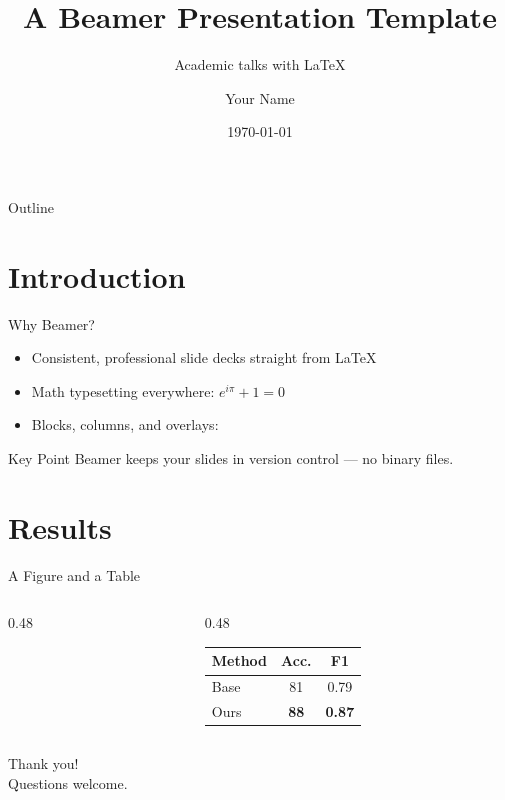 \documentclass[aspectratio=169, 11pt]{beamer}
\title[Short Title]{A Beamer Presentation Template}
\subtitle{Academic talks with \LaTeX}
\author{Your Name}
\institute{Example University}
\date{\today}
\begin{document}
\begin{frame}
  \titlepage
\end{frame}

\begin{frame}{Outline}
  \tableofcontents
\end{frame}

\section{Introduction}

\begin{frame}{Why Beamer?}
  \begin{itemize}
    \item Consistent, professional slide decks straight from \LaTeX{}
    \item Math typesetting everywhere: $e^{i\pi} + 1 = 0$
    \item Blocks, columns, and overlays:
  \end{itemize}
  \begin{block}{Key Point}
    Beamer keeps your slides in version control — no binary files.
  \end{block}
\end{frame}

\section{Results}

\begin{frame}{A Figure and a Table}
  \begin{columns}
    \begin{column}{0.48\textwidth}
      \centering
    \end{column}
    \begin{column}{0.48\textwidth}
      \begin{table}
        \centering
        \begin{tabular}{lcc}
          \toprule
          Method & Acc. & F1 \\
          \midrule
          Base & 81 & 0.79 \\
          Ours & \textbf{88} & \textbf{0.87} \\
          \bottomrule
        \end{tabular}
      \end{table}
    \end{column}
  \end{columns}
\end{frame}

\begin{frame}
  \centering
  {\Huge Thank you!}\\[1em]
  Questions welcome.
\end{frame}
\end{document}
